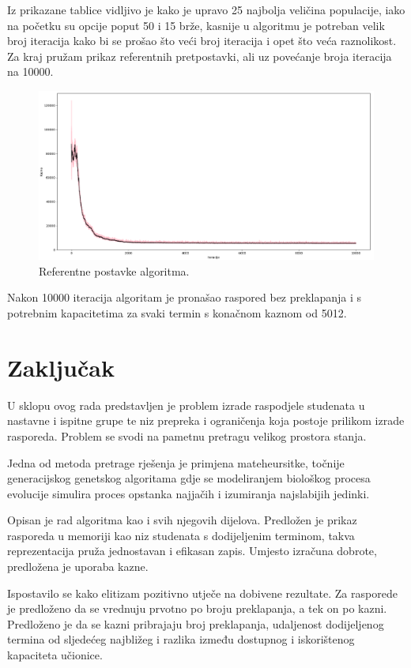 \documentclass[times, utf8, zavrsni]{fer}
\begin{document}
Iz prikazane tablice vidljivo je kako je upravo 25 najbolja veličina populacije, iako na početku su opcije poput 50 i 15 brže, kasnije u algoritmu je potreban velik broj iteracija kako bi se prošao što veći broj iteracija i opet što veća raznolikost. Za kraj pružam prikaz referentnih pretpostavki, ali uz povećanje broja iteracija na 10000.

\begin{figure}[htb]
\centering
\includegraphics[width=15cm]{images/final.png}
\caption{Referentne postavke algoritma.}
\label{fig:final}
\end{figure}

Nakon 10000 iteracija algoritam je pronašao raspored bez preklapanja i s potrebnim kapacitetima za svaki termin s konačnom kaznom od 5012.

\chapter{Zaključak}

U sklopu ovog rada predstavljen je problem izrade raspodjele studenata u nastavne i ispitne grupe te niz prepreka i ograničenja koja postoje prilikom izrade rasporeda. Problem se svodi na pametnu pretragu velikog prostora stanja.

Jedna od metoda pretrage rješenja je primjena mateheursitke, točnije generacijskog genetskog algoritama gdje se modeliranjem biološkog procesa evolucije simulira proces opstanka najjačih i izumiranja najslabijih jedinki.

Opisan je rad algoritma kao i svih njegovih dijelova. Predložen je prikaz rasporeda u memoriji kao niz studenata s dodijeljenim terminom, takva reprezentacija pruža jednostavan i efikasan zapis. Umjesto izračuna dobrote, predložena je uporaba kazne.

Ispostavilo se kako elitizam pozitivno utječe na dobivene rezultate. Za rasporede je predloženo da se vrednuju prvotno po broju preklapanja, a tek on po kazni. Predloženo je da se kazni pribrajaju broj preklapanja, udaljenost dodijeljenog termina od sljedećeg najbližeg i razlika između dostupnog i iskorištenog kapaciteta učionice.
\end{document}
